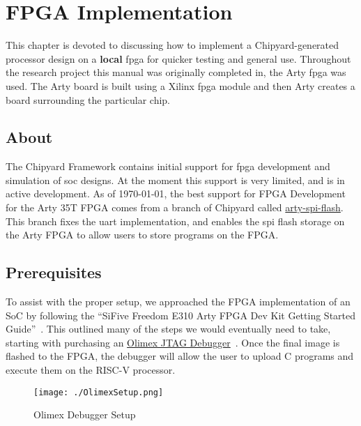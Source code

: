 \chapter{FPGA Implementation}\label{chap:FPGA_Implementation}
This chapter is devoted to discussing how to implement a Chipyard-generated processor design on a \textbf{local} \gls{fpga} for quicker testing and general use.
Throughout the research project this manual was originally completed in, the Arty \gls{fpga} was used.
The Arty board is built using a Xilinx \gls{fpga} module and then Arty creates a board surrounding the particular chip.

\section{About}\label{sec:About}
The Chipyard Framework contains initial support for \gls{fpga} development and simulation of \gls{soc} designs.
At the moment this support is very limited, and is in active development.
As of \today, the best support for FPGA Development for the Arty 35T FPGA comes from a branch of Chipyard called \href{https://github.com/ucb-bar/chipyard/tree/arty-spi-flash}{arty-spi-flash}.
This branch fixes the \gls{uart} implementation, and enables the \gls{spi} flash storage on the Arty FPGA to allow users to store programs on the FPGA.

\section{Prerequisites}\label{sec:Prerequisites}
To assist with the proper setup, we approached the FPGA implementation of an SoC by following the ``SiFive Freedom E310 Arty FPGA Dev Kit Getting Started Guide''~\cite{FreedomDevGuide}.
This outlined many of the steps we would eventually need to take, starting with purchasing an \href{https://www.digikey.com/en/products/detail/olimex-ltd/ARM-USB-TINY-H/3471388}{Olimex JTAG Debugger}~\cite{OlimexJTAG}.
Once the final image is flashed to the FPGA, the debugger will allow the user to upload C programs and execute them on the RISC-V processor.

\begin{figure}[h!tbp]
  \centering
  \texttt{[image: ./OlimexSetup.png]}
  \caption{Olimex Debugger Setup~\cite[p.~5]{FreedomDevGuide}}
  \label{fig:olimexsetup}
\end{figure}

